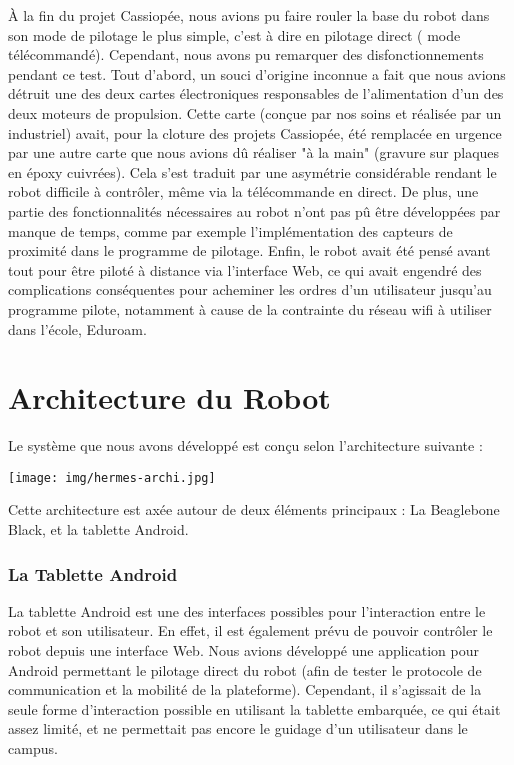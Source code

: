\documentclass{report}
\begin{document}
    {À la fin du projet Cassiopée, nous avions pu faire rouler la base du robot
    dans son mode de pilotage le plus simple, c'est à dire en pilotage direct (
    mode télécommandé). Cependant, nous avons pu remarquer des disfonctionnements
    pendant ce test. Tout d'abord, un souci d'origine inconnue a fait que nous avions
    détruit une des deux cartes électroniques responsables de l'alimentation d'un
    des deux moteurs de propulsion. Cette carte (conçue par nos soins et réalisée
    par un industriel) avait, pour la cloture des projets Cassiopée, été remplacée
    en urgence par une autre carte que nous avions dû réaliser "à la main"
    (gravure sur plaques en époxy cuivrées). Cela s'est traduit par une asymétrie
    considérable rendant le robot difficile à contrôler, même via la télécommande
    en direct. De plus, une partie des fonctionnalités nécessaires au robot n'ont
    pas pû être développées par manque de temps, comme par exemple l'implémentation
    des capteurs de proximité dans le programme de pilotage. Enfin, le robot avait
    été pensé avant tout pour être piloté à distance via l'interface Web, ce qui
    avait engendré des complications conséquentes pour acheminer les ordres d'un
    utilisateur jusqu'au programme pilote, notamment à cause de la contrainte du
    réseau wifi à utiliser dans l'école, Eduroam.}


    \section{Architecture du Robot}

    {Le système que nous avons développé est conçu selon l'architecture suivante :}

    \texttt{[image: img/hermes-archi.jpg]}

    {Cette architecture est axée autour de deux éléments principaux :
    La Beaglebone Black, et la tablette Android.}

    \subsubsection{La Tablette Android}

    {La tablette Android est une des interfaces possibles pour l'interaction entre le robot
    et son utilisateur. En effet, il est également prévu de pouvoir contrôler le robot
    depuis une interface Web. Nous avions développé une application pour Android
    permettant le pilotage direct du robot (afin de tester le protocole de communication
    et la mobilité de la plateforme). Cependant, il s'agissait de la seule forme d'interaction
    possible en utilisant la tablette embarquée, ce qui était assez limité, et ne permettait
     pas encore le guidage d'un utilisateur dans le campus.}
\end{document}
